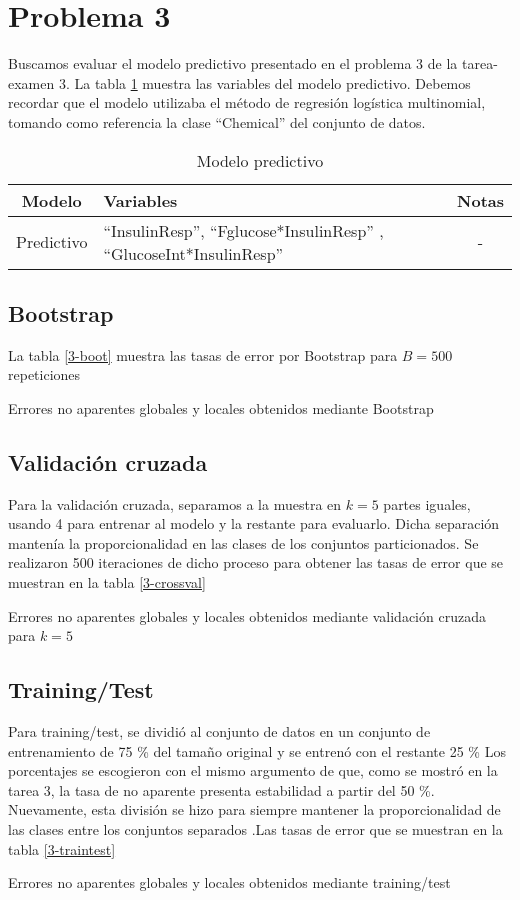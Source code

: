 \documentclass[11pt]{article}
\begin{document}
\section{Problema 3}
Buscamos evaluar el modelo predictivo presentado en el problema 3 de la tarea-examen 3. La tabla \ref{3-models} muestra las variables del modelo predictivo. Debemos recordar que el modelo utilizaba el método de regresión logística multinomial, tomando como referencia la clase ``Chemical'' del conjunto de datos. 
\begin{table}[H]
    \centering
    \begin{tabular}{c|p{7cm}|c}
        Modelo & Variables & Notas \\
        \hline
        Predictivo & ``InsulinResp'', ``Fglucose*InsulinResp'' , ``GlucoseInt*InsulinResp'' & - \\
    \end{tabular}
    \caption{Modelo predictivo}
    \label{3-models}
\end{table}
\subsection{Bootstrap}
La tabla \ref{3-boot} muestra las tasas de error por Bootstrap para $B=500$ repeticiones
\begin{table}[H]
    \centering
    
    \caption{Errores no aparentes globales y locales obtenidos mediante Bootstrap}
    \label{3-boot}
\end{table}
\subsection{Validación cruzada}
Para la validación cruzada, separamos a la muestra en $k=5$ partes iguales, usando 4 para entrenar al modelo y la restante para evaluarlo. Dicha separación mantenía la proporcionalidad en las clases de los conjuntos particionados. Se realizaron 500 iteraciones de dicho proceso para obtener las tasas de error que se muestran en la tabla \ref{3-crossval}    
\begin{table}[H]
    \centering
    
    \caption{Errores no aparentes globales y locales obtenidos mediante validación cruzada para $k=5$}
    \label{3-crossval}
\end{table}
\subsection{Training/Test}
Para training/test, se dividió al conjunto de datos en un conjunto de entrenamiento de 75 \% del tamaño original y se entrenó con el restante 25 \% Los porcentajes se escogieron con el mismo argumento de que, como se mostró en la tarea 3, la tasa de no aparente presenta estabilidad a partir del 50 \%. Nuevamente, esta división se hizo para siempre mantener la proporcionalidad de las clases entre los conjuntos separados .Las tasas de error que se muestran en la tabla \ref{3-traintest}
\begin{table}[H]
    \centering
    
    \caption{Errores no aparentes globales y locales obtenidos mediante training/test}
    \label{3-traintest}
\end{table}
\end{document}
